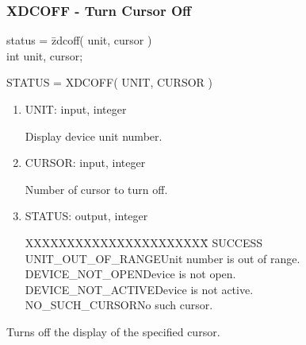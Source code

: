 \subsubsection{XDCOFF - Turn Cursor Off}
\begin{tabbing}
status = \=zdcoff( unit, cursor )\\
\>int  unit, cursor;\\
\end{tabbing}
STATUS = XDCOFF( UNIT, CURSOR )
\begin{enumerate}
\item UNIT:  input, integer

Display device unit number.
\item CURSOR:  input, integer

Number of cursor to turn off.
\item STATUS:  output, integer
\begin{tabbing}
XXXXXXXXXXXXXXXXXXXXXX\=\kill
SUCCESS\\
UNIT\_OUT\_OF\_RANGE\>Unit number is out of range.\\
DEVICE\_NOT\_OPEN\>Device is not open.\\
DEVICE\_NOT\_ACTIVE\>Device is not active.\\
NO\_SUCH\_CURSOR\>No such cursor.\\
\end{tabbing}
\end{enumerate}
Turns off the display of the specified cursor.
\newpage
